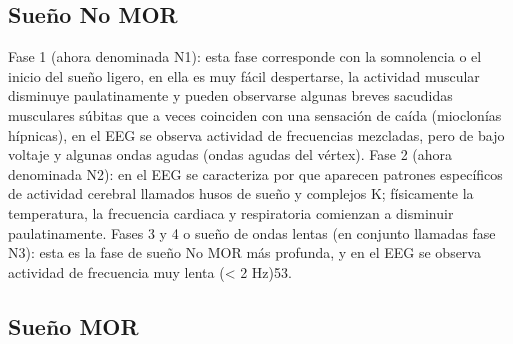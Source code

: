 
\subsection{Sueño No MOR}

Fase 1 (ahora denominada N1): esta fase corresponde con la somnolencia o el inicio del sueño ligero, en ella es muy fácil despertarse, la actividad muscular disminuye paulatinamente y pueden observarse algunas breves sacudidas musculares súbitas que a veces coinciden con una sensación de caída (mioclonías hípnicas), en el EEG se observa actividad de frecuencias mezcladas, pero de bajo voltaje y algunas ondas agudas (ondas agudas del vértex). Fase 2 (ahora denominada N2): en el EEG se caracteriza por que aparecen patrones específicos de actividad cerebral llamados husos de sueño y complejos K; físicamente la temperatura, la frecuencia cardiaca y respiratoria comienzan a disminuir paulatinamente. Fases 3 y 4 o sueño de ondas lentas (en conjunto llamadas fase N3): esta es la fase de sueño No MOR más profunda, y en el EEG se observa actividad de frecuencia muy lenta (< 2 Hz)53.


\subsection{Sueño MOR}

